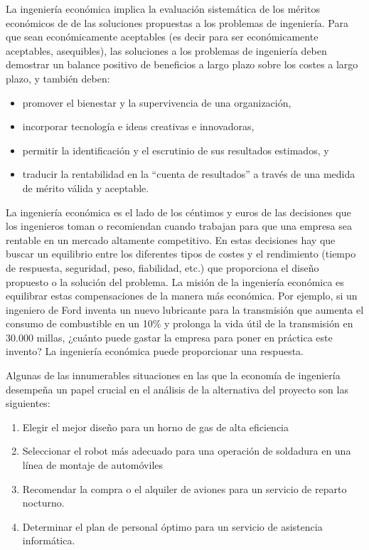 \documentclass[
]{krantz}
\providecommand{\tightlist}{%
  \setlength{\itemsep}{0pt}\setlength{\parskip}{0pt}}
\begin{document}
La ingeniería económica implica la evaluación sistemática de los méritos económicos de de las soluciones propuestas a los problemas de ingeniería. Para que sean económicamente aceptables (es decir para ser económicamente aceptables, asequibles), las soluciones a los problemas de ingeniería deben demostrar un balance positivo de beneficios a largo plazo sobre los costes a largo plazo, y también deben:

\begin{itemize}
\tightlist
\item
  promover el bienestar y la supervivencia de una organización,
\item
  incorporar tecnología e ideas creativas e innovadoras,
\item
  permitir la identificación y el escrutinio de sus resultados estimados, y
\item
  traducir la rentabilidad en la ``cuenta de resultados'' a través de una medida de mérito válida y aceptable.
\end{itemize}

La ingeniería económica es el lado de los céntimos y euros de las decisiones que los ingenieros toman o recomiendan cuando trabajan para que una empresa sea rentable en un mercado altamente competitivo. En estas decisiones hay que buscar un equilibrio entre los diferentes tipos de costes y el rendimiento (tiempo de respuesta, seguridad, peso, fiabilidad, etc.) que proporciona el diseño propuesto o la solución del problema. La misión de la ingeniería económica es equilibrar estas compensaciones de la manera más económica. Por ejemplo, si un ingeniero de Ford inventa un nuevo lubricante para la transmisión que aumenta el consumo de combustible en un 10\% y prolonga la vida útil de la transmisión en 30.000 millas, ¿cuánto puede gastar la empresa para poner en práctica este invento? La ingeniería económica puede proporcionar una respuesta.

Algunas de las innumerables situaciones en las que la economía de ingeniería desempeña un papel crucial en el análisis de la alternativa del proyecto son las siguientes:

\begin{enumerate}
\def\labelenumi{\arabic{enumi}.}
\tightlist
\item
  Elegir el mejor diseño para un horno de gas de alta eficiencia
\item
  Seleccionar el robot más adecuado para una operación de soldadura en una línea de montaje de automóviles
\item
  Recomendar la compra o el alquiler de aviones para un servicio de reparto nocturno.
\item
  Determinar el plan de personal óptimo para un servicio de asistencia informática.
\end{enumerate}
\end{document}
